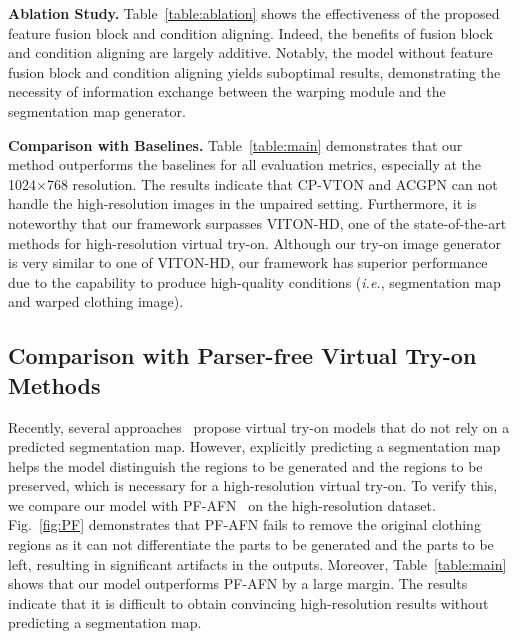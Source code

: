 \noindent \textbf{Ablation Study.}
Table~\ref{table:ablation} shows the effectiveness of the proposed feature fusion block and condition aligning.
Indeed, the benefits of fusion block and condition aligning are largely additive.
Notably, the model without feature fusion block and condition aligning yields suboptimal results, demonstrating the necessity of information exchange between the warping module and the segmentation map generator.

\noindent \textbf{Comparison with Baselines.} Table~\ref{table:main} demonstrates that our method outperforms the baselines for all evaluation metrics, especially at the 1024$\times$768 resolution.
The results indicate that CP-VTON and ACGPN can not handle the high-resolution images in the unpaired setting.
Furthermore, it is noteworthy that our framework surpasses VITON-HD, one of the state-of-the-art methods for high-resolution virtual try-on.
Although our try-on image generator is very similar to one of VITON-HD, our framework has superior performance due to the capability to produce high-quality conditions (\textit{i.e.}, segmentation map and warped clothing image).

\subsection{Comparison with Parser-free Virtual Try-on Methods}
Recently, several approaches~\cite{issenhuth2020not,ge2021parser} propose virtual try-on models that do not rely on a predicted segmentation map.
However, explicitly predicting a segmentation map helps the model distinguish the regions to be generated and the regions to be preserved, which is necessary for a high-resolution virtual try-on.
To verify this, we compare our model with PF-AFN~\cite{ge2021parser} on the high-resolution dataset.
Fig.~\ref{fig:PF} demonstrates that PF-AFN fails to remove the original clothing regions as it can not differentiate the parts to be generated and the parts to be left, resulting in significant artifacts in the outputs.
Moreover, Table~\ref{table:main} shows that our model outperforms PF-AFN by a large margin.
The results indicate that it is difficult to obtain convincing high-resolution results without predicting a segmentation map.

